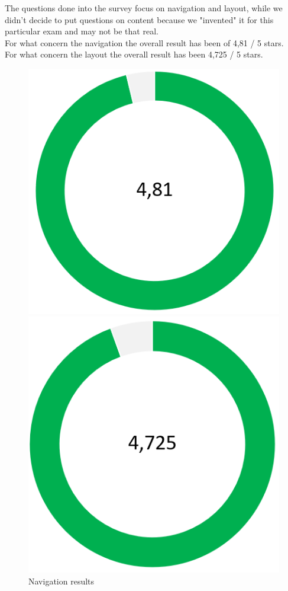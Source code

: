 \documentclass[11pt, a4paperm, hidelinks]{article}
\begin{document}
	The questions done into the survey focus on navigation and layout, while we didn't decide to put questions on content 			because we "invented" it for this particular exam and may not be that real. \\ For what concern the navigation the overall 			result has been of 4,81 / 5 stars. \\ For what concern the layout the overall result has been 4,725 / 5 stars.
	\begin{figure}[h!]
	\centering
	\begin{minipage}[b]{0.4\textwidth}
    		\includegraphics[width=\textwidth]{./assets/nav.PNG}
		\caption{Navigation results}
	\end{minipage}
	\hfill
	\centering
	\begin{minipage}[b]{0.4\textwidth}
    		\includegraphics[width=\textwidth]{./assets/layout.PNG}

\end{minipage}
\end{figure}
\end{document}
